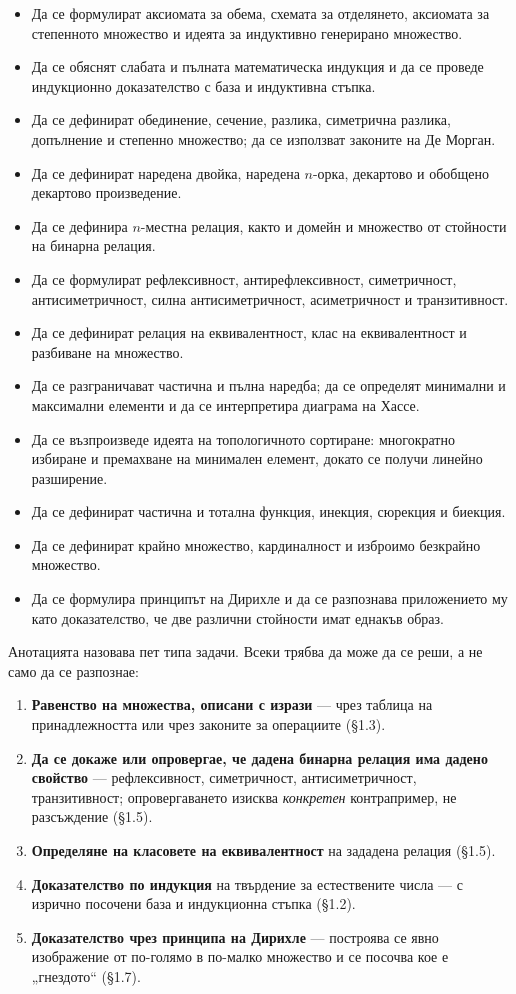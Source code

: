 \begin{itemize}
\item Да се формулират аксиомата за обема, схемата за отделянето, аксиомата за степенното множество и идеята за индуктивно генерирано множество.
\item Да се обяснят слабата и пълната математическа индукция и да се проведе индукционно доказателство с база и индуктивна стъпка.
\item Да се дефинират обединение, сечение, разлика, симетрична разлика, допълнение и степенно множество; да се използват законите на Де Морган.
\item Да се дефинират наредена двойка, наредена $n$-орка, декартово и обобщено декартово произведение.
\item Да се дефинира $n$-местна релация, както и домейн и множество от стойности на бинарна релация.
\item Да се формулират рефлексивност, антирефлексивност, симетричност, антисиметричност, силна антисиметричност, асиметричност и транзитивност.
\item Да се дефинират релация на еквивалентност, клас на еквивалентност и разбиване на множество.
\item Да се разграничават частична и пълна наредба; да се определят минимални и максимални елементи и да се интерпретира диаграма на Хассе.
\item Да се възпроизведе идеята на топологичното сортиране: многократно избиране и премахване на минимален елемент, докато се получи линейно разширение.
\item Да се дефинират частична и тотална функция, инекция, сюрекция и биекция.
\item Да се дефинират крайно множество, кардиналност и изброимо безкрайно множество.
\item Да се формулира принципът на Дирихле и да се разпознава приложението му като доказателство, че две различни стойности имат еднакъв образ.
\end{itemize}

Анотацията назовава пет типа задачи. Всеки трябва да може да се реши, а не само
да се разпознае:

\begin{enumerate}
\item \textbf{Равенство на множества, описани с изрази} --- чрез таблица на
принадлежността или чрез законите за операциите (\S1.3).
\item \textbf{Да се докаже или опровергае, че дадена бинарна релация има дадено
свойство} --- рефлексивност, симетричност, антисиметричност, транзитивност;
опровергаването изисква \emph{конкретен} контрапример, не разсъждение (\S1.5).
\item \textbf{Определяне на класовете на еквивалентност} на зададена релация
(\S1.5).
\item \textbf{Доказателство по индукция} на твърдение за естествените числа ---
с изрично посочени база и индукционна стъпка (\S1.2).
\item \textbf{Доказателство чрез принципа на Дирихле} --- построява се явно
изображение от по-голямо в по-малко множество и се посочва кое е „гнездото“
(\S1.7).
\end{enumerate}
